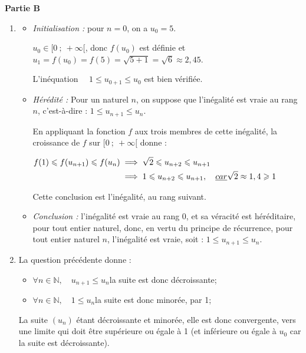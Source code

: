 \documentclass[10pt]{article}
\providecommand{\N}{\mathbb{N}}
\begin{document}
\medskip
\textbf{Partie B}

\medskip

\begin{enumerate}
	\item \begin{itemize}
		\item \emph{Initialisation :} pour  $n= 0$, on a $u_0 = 5$.

$u_0 \in [0~;~+\infty[$, donc $f(u_0)$ est définie et $u_1 = f(u_0) = f(5) = \sqrt{5+1} = \sqrt{6} \approx 2,45$.

L'inéquation $ \quad 1 \leqslant u_{0+1} \leqslant u_0$ \quad est bien vérifiée.

		\item \emph{Hérédité :} Pour un naturel $n$, on suppose que l'inégalité est vraie au rang $n$, c'est-à-dire : \quad $1 \leqslant u_{n+1} \leqslant u_n$.

En appliquant la fonction $f$ aux trois membres de cette inégalité, la croissance de $f$ sur $[0~;~+\infty[$ donne :

$\begin{aligned} f(1 ) \leqslant f(u_{n+1})\leqslant f(u_n) &\implies \sqrt{2} \leqslant u_{n+2} \leqslant u_{n+1}\\
&\implies 1 \leqslant u_{n+2} \leqslant u_{n+1},\quad \emph{car } \sqrt{2} \approx 1,4 \geqslant 1\end{aligned}$

Cette conclusion est l'inégalité, au rang suivant.

	\item \emph{Conclusion :} l'inégalité est vraie au rang 0, et sa véracité est héréditaire, pour tout entier naturel, donc, en vertu du principe de récurrence, pour tout entier naturel $n$, l'inégalité est vraie, soit : \quad $1 \leqslant u_{n+1} \leqslant u_{n}$.
		\end{itemize}

	\item La question précédente donne :
\begin{itemize}[left=5mm]
		\item $\forall n\in \N, \quad u_{n+1} \leqslant u_n$\quad la suite est donc décroissante;
		\item $\forall n\in \N, \quad 1 \leqslant u_n$\quad la suite est donc minorée, par 1;
	\end{itemize}

La suite $\left(u_n\right)$ étant décroissante et minorée, elle est donc convergente, vers une limite qui doit être supérieure ou égale à 1 (et inférieure ou égale à $u_0$ car la suite est décroissante).


\end{enumerate}
\end{document}
